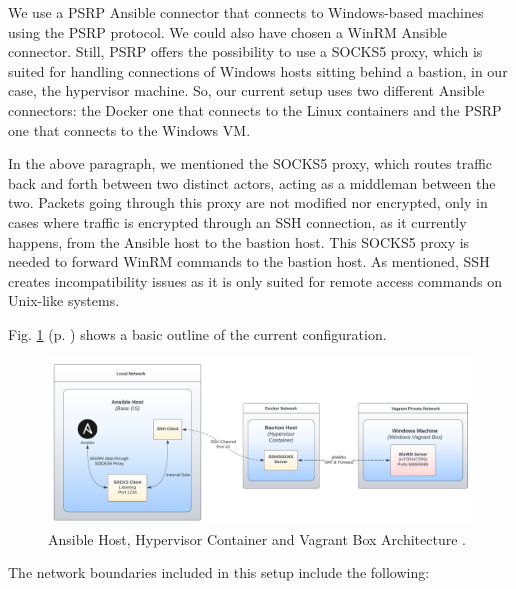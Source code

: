 We use a PSRP Ansible connector that connects to Windows-based machines using the PSRP protocol. We could also have chosen a WinRM Ansible connector. Still, PSRP offers the possibility to use a SOCKS5 proxy, which is suited for handling connections of Windows hosts sitting behind a bastion, in our case, the hypervisor machine. So, our current setup uses two different Ansible connectors: the Docker one that connects to the Linux containers and the PSRP one that connects to the Windows VM.

In the above paragraph, we mentioned the SOCKS5 proxy, which routes traffic back and forth between two distinct actors, acting as a middleman between the two. Packets going through this proxy are not modified nor encrypted, only in cases where traffic is encrypted through an SSH connection, as it currently happens, from the Ansible host to the bastion host. This SOCKS5 proxy is needed to forward WinRM commands to the bastion host. As mentioned, SSH creates incompatibility issues as it is only suited for remote access commands on Unix-like systems.

Fig. \ref{fig:vagrant_kvm_host} (p. \pageref{fig:vagrant_kvm_host}) shows a basic outline of the current configuration.

\begin{figure}[H]
    \includegraphics[width=13cm]{figures/vagrant_kvm_setup.pdf}
    \caption{Ansible Host, Hypervisor Container and Vagrant Box Architecture \cite{vagrant_kvm_host_ref}.}
    \label{fig:vagrant_kvm_host}
\end{figure}


The network boundaries included in this setup include the following:

